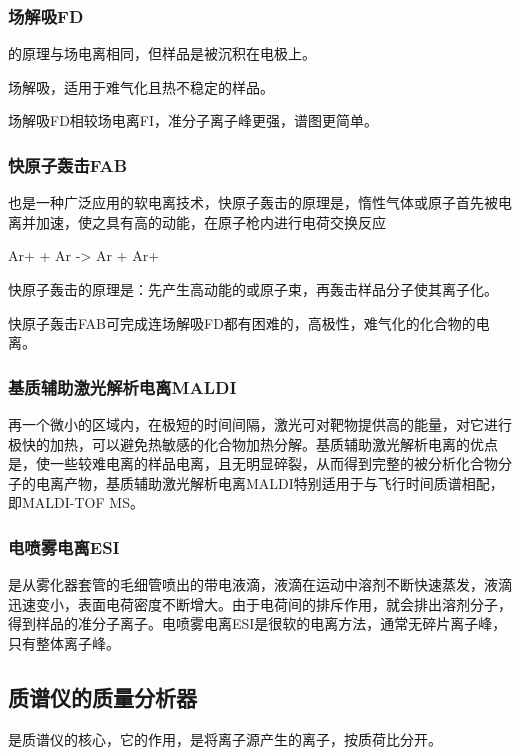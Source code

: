 \subsubsection{场解吸FD}
的原理与场电离相同，但样品是被沉积在电极上。

场解吸，适用于难气化且热不稳定的样品。

场解吸FD相较场电离FI，准分子离子峰更强，谱图更简单。

\subsubsection{快原子轰击FAB}
也是一种广泛应用的软电离技术，快原子轰击的原理是，惰性气体或原子首先被电离并加速，使之具有高的动能，在原子枪内进行电荷交换反应
\begin{Chemeq}
    Ar+ + Ar -> Ar + Ar+
\end{Chemeq}
快原子轰击的原理是：先产生高动能的或原子束，再轰击样品分子使其离子化。

快原子轰击FAB可完成连场解吸FD都有困难的，高极性，难气化的化合物的电离。

\subsubsection{基质辅助激光解析电离MALDI}
再一个微小的区域内，在极短的时间间隔，激光可对靶物提供高的能量，对它进行极快的加热，可以避免热敏感的化合物加热分解。基质辅助激光解析电离的优点是，使一些较难电离的样品电离，且无明显碎裂，从而得到完整的被分析化合物分子的电离产物，基质辅助激光解析电离MALDI特别适用于与飞行时间质谱相配，即MALDI-TOF MS。

\subsubsection{电喷雾电离ESI}
是从雾化器套管的毛细管喷出的带电液滴，液滴在运动中溶剂不断快速蒸发，液滴迅速变小，表面电荷密度不断增大。由于电荷间的排斥作用，就会排出溶剂分子，得到样品的准分子离子。电喷雾电离ESI是很软的电离方法，通常无碎片离子峰，只有整体离子峰。

\subsection{质谱仪的质量分析器}
是质谱仪的核心，它的作用，是将离子源产生的离子，按质荷比分开。

